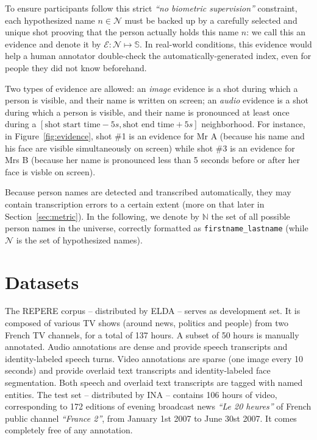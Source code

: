 \documentclass{acm_proc_article-me}
\newcommand\refNames{\mathbb{N}}
\newcommand\shots{\mathbb{S}}
\newcommand\hypEvidences{\mathcal{E}}
\newcommand\hypNames{\mathcal{N}}
\begin{document}
To ensure participants follow this strict \emph{``no biometric supervision''} constraint, each hypothesized name $n \in \hypNames$ must be backed up by a carefully selected and unique shot prooving that the person actually holds this name $n$: we call this an evidence and denote it by $\hypEvidences : \hypNames \mapsto \shots$. In real-world conditions, this evidence would help a human annotator double-check the automatically-generated index, even for people they did not know beforehand.

Two types of evidence are allowed: an \emph{image} evidence is a shot during which a person is visible, and their name is written on screen; an \emph{audio} evidence is a shot during which a person is visible, and their name is pronounced at least once during a $[\text{shot start time} - 5s, \text{shot end time} + 5s ]$ neighborhood.
For instance, in Figure~\ref{fig:evidence}, shot \#1 is an evidence for Mr A (because his name and his face are visible simultaneously on screen) while shot \#3 is an evidence for Mrs B (because her name is pronounced less than 5 seconds before or after her face is visble on screen).

Because person names are detected and transcribed automatically, they may contain transcription errors to a certain extent (more on that later in Section~\ref{sec:metric}). In the following, we denote by $\refNames$ the set of all possible person names in the universe, correctly formatted as \texttt{firstname\_lastname} (while $\hypNames$ is the set of hypothesized names).

\section{Datasets}

The REPERE corpus -- distributed by ELDA -- serves as development set. It is composed of various TV shows (around news, politics and people) from two French TV channels, for a total of 137 hours. A subset of 50 hours is manually annotated. Audio annotations are dense and provide speech transcripts and identity-labeled speech turns. Video annotations are sparse (one image every 10 seconds) and provide overlaid text transcripts and identity-labeled face segmentation. Both speech and overlaid text transcripts are tagged with named entities.
The test set -- distributed by INA -- contains 106 hours of video, corresponding to 172 editions of evening broadcast news \emph{``Le 20 heures''} of French public channel \emph{``France 2''}, from January 1st 2007 to June 30st 2007. It comes completely free of any annotation.
\end{document}
